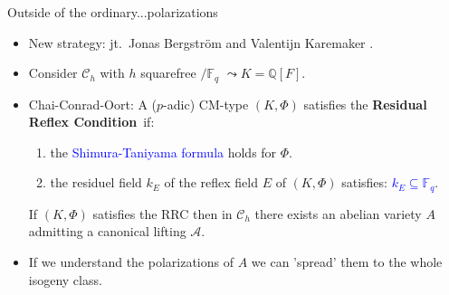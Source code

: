 \documentclass[usenames,dvipsnames]{beamer}
\def\Q{\mathbb{Q}}
\def\F{\mathbb{F}}
\DeclareMathOperator{\Hom}{Hom}
\newcommand{\cG}{\mathcal{G}}
\newcommand{\cA}{{\mathcal A}}
\newcommand{\cC}{{\mathcal C}}
\newcommand{\vphi}{\varphi}
\newcommand{\set}[1]{\left\lbrace#1\right\rbrace }
\newcommand{\red}[1]{\textcolor{red}{#1}}
\newcommand{\blue}[1]{\textcolor{blue}{#1}}
\begin{document}
\begin{frame}{ Outside of the ordinary...polarizations } 
	\begin{itemize}
	\item New strategy: jt.~Jonas Bergstr\"om and Valentijn Karemaker \cite{BergKarMar21}.
\pause
	\item Consider $\cC_h$ with $h$ squarefree $/\F_q$ $\leadsto K=\Q[F]$. 
\pause 
    \item Chai-Conrad-Oort:
    A ($p$-adic) CM-type $(K,\Phi)$ satisfies the {\bf Residual Reflex Condition}~if:
    \begin{enumerate}[1.]
\pause 
    \item the \blue{Shimura-Taniyama formula} holds for $\Phi$.
\pause
    \item the residuel field $k_E$ of the reflex field $E$ of $(K,\Phi)$ satisfies: \blue{$k_E \subseteq \F_q$}.
    \end{enumerate}
\pause
    \begin{theorem}
    If $(K,\Phi)$ satisfies the RRC then in $\cC_h$ there exists an abelian variety $A$ admitting a canonical lifting $\cA$. 
    \end{theorem}
\pause
    \item If we understand the polarizations of $A$ we can 'spread' them to the whole isogeny class.
    \end{itemize}
\end{frame}

\end{document}
